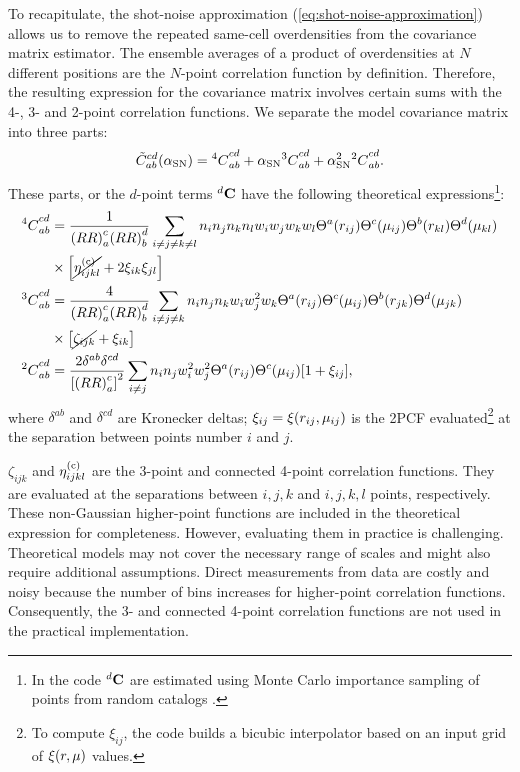 To recapitulate, the shot-noise approximation (\cref{eq:shot-noise-approximation}) allows us to remove the repeated same-cell overdensities from the covariance matrix estimator.
The ensemble averages of a product of overdensities at $N$ different positions are the $N$-point correlation function by definition.
Therefore, the resulting expression for the covariance matrix involves certain sums with the 4-, 3- and 2-point correlation functions.
We separate the model covariance matrix into three parts:
\begin{equation} \label{eq:Cov2x2estimator}
\tilde C_{ab}^{cd} \qty(\alpha_{\rm SN}) = {^4C}_{ab}^{cd} + \alpha_{\rm SN} {^3C}_{ab}^{cd} + \alpha_{\rm SN}^2 {^2C}_{ab}^{cd}.
\end{equation}
These parts, or the $d$-point terms $^d {\bf C}$ have the following theoretical expressions\footnote{In the \rascalc{} code $^d {\bf C}$ are estimated using Monte Carlo importance sampling of points from random catalogs \citep{rascalC}.}:
\begin{align} \label{eq:Cov2x2_234_Point_Defs}
{^4C}_{ab}^{cd} &= \frac{1}{\qty(RR)_a^c \qty(RR)_b^d} \sum_{i\neq j\neq k\neq l} n_i n_j n_k n_l w_i w_j w_k w_l \Theta^a(r_{ij}) \Theta^c(\mu_{ij}) \Theta^b(r_{kl}) \Theta^d(\mu_{kl}) \\ \nonumber
& \times \qty[\cancel{\eta^{({\rm c})}_{ijkl}} + 2 \xi_{ik} \xi_{jl}] \\ \nonumber
{^3C}_{ab}^{cd} &= \frac{4}{\qty(RR)_a^c \qty(RR)_b^d} \sum_{i\neq j\neq k} n_i n_j n_k w_i w_j^2 w_k \Theta^a(r_{ij}) \Theta^c(\mu_{ij}) \Theta^b(r_{jk}) \Theta^d(\mu_{jk}) \\ \nonumber
& \times \qty[\cancel{\zeta_{ijk}} + \xi_{ik}] \\ \nonumber
{^2C}_{ab}^{cd} &= \frac{2\delta^{ab}\delta^{cd}}{\qty[\qty(RR)_a^c]^2} \sum_{i\neq j} n_i n_j w_i^2 w_j^2 \Theta^a(r_{ij}) \Theta^c(\mu_{ij}) \qty[1+\xi_{ij}],
\end{align}
where $\delta^{ab}$ and $\delta^{cd}$ are Kronecker deltas; $\xi_{ij} = \xi\qty(r_{ij}, \mu_{ij})$ is the 2PCF evaluated\footnote{To compute $\xi_{ij}$, the \rascalc{} code builds a bicubic interpolator based on an input grid of $\xi\qty(r, \mu)$ values.} at the separation between points number $i$ and $j$.

$\zeta_{ijk}$ and $\eta^{{(\rm c)}}_{ijkl}$ are the 3-point and connected 4-point correlation functions.
They are evaluated at the separations between $i,j,k$ and $i,j,k,l$ points, respectively.
These non-Gaussian higher-point functions are included in the theoretical expression for completeness.
However, evaluating them in practice is challenging.
Theoretical models may not cover the necessary range of scales and might also require additional assumptions.
Direct measurements from data are costly and noisy because the number of bins increases for higher-point correlation functions.
Consequently, the 3- and connected 4-point correlation functions are not used in the practical implementation.

